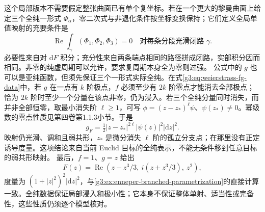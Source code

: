 这个局部版本不需要假定整张曲面已有单个复坐标。若在一个更大的黎曼曲面上给定三个全纯一形式 \(\Phi_\alpha\)，零二次式与非退化条件按坐标变换保持；它们定义全局单值映射的充要条件是
\begin{equation}\label{g3:eq:weierstrass-real-period}
	\operatorname{Re}\int_\gamma(\Phi_1,\Phi_2,\Phi_3)=0
	\quad\text{对每条分段光滑闭路 }\gamma.
\end{equation}
必要性来自对 \(\mathrm dF\) 积分；充分性来自两条端点相同的路径拼成闭路，实部积分因而相同。非零的纯虚周期可以允许，要求复周期本身全为零则过强。
\ProseParagraphBreak
公式中的 \(g\) 也可以是亚纯函数，但须先保证三个一形式实际全纯。在式\eqref{g3:eq:weierstrass-fg-data}中，若 \(g\) 在一点有 \(k\) 阶极点，\(f\) 必须至少有 \(2k\) 阶零点才能消去全部极点；恰为 \(2k\) 阶时至少一个分量在该点非零，仍为浸入。若三个全纯分量同时消失，而并非全部恒零，取最小消失阶 \(\ell\ge1\)，可写 \(\phi=(z-z_*)^\ell\psi\)、\(\psi(z_*)\ne0\)。幂级数的零点性质见第四卷第1.1.3小节。于是
\[
	g_F=\tfrac12|z-z_*|^{2\ell}|\psi(z)|^2|\mathrm dz|^2.
\]
映射仍光滑、调和且弱共形，\(z_*\) 是微分消失 \(\ell\) 阶的孤立分支点；在那里没有正定诱导度量。这项结论来自当前 Euclid 目标的全纯表示，不能无条件移到任意目标的弱共形映射。
\ProseParagraphBreak
最后，\(f=1\)、\(g=z\) 给出
\[
	F(z)=\operatorname{Re}(z-z^3/3,\ i(z+z^3/3),\ z^2),
\]
度量为 \((1+|z|^2)^2|\mathrm dz|^2\)，与\cref{g3:ex:enneper-branched-parametrization}的直接计算一致。全纯数据保证局部浸入和极小性；它本身不保证整体单射、适当性或完备性，这些性质仍须逐个模型核对。
